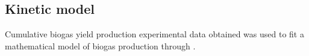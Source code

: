 \subsection{Kinetic model}
Cumulative biogas yield production experimental data obtained was used to fit a mathematical model of biogas production through .
